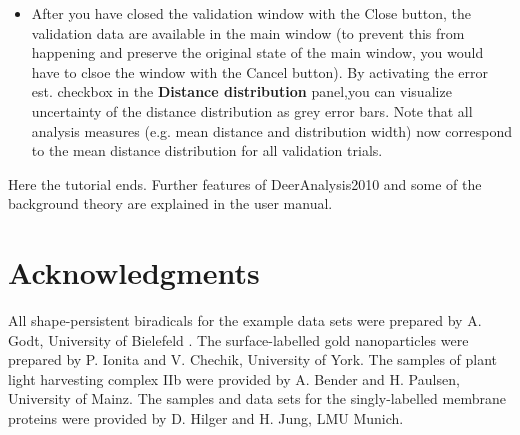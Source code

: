 \documentclass[11pt,a4paper]{article}
\begin{document}
\begin{itemize}
	\item After you have closed the validation window with the {\ttfamily Close} button, the validation data are available in the main window (to prevent this from happening and preserve the original state of the main window, you would have to clsoe the window with the {\ttfamily Cancel} button). By activating the {\ttfamily error est.} checkbox in the {\ttfamily \bf Distance distribution} panel,you can visualize uncertainty of the distance distribution as grey error bars. Note that all analysis measures (e.g. mean distance and distribution width) now correspond to the mean distance distribution for all validation trials.  	 
\end{itemize}

Here the tutorial ends. Further features of DeerAnalysis2010 and some of the background theory are explained in the user manual. 

\section*{Acknowledgments}
All shape-persistent biradicals for the example data sets were prepared by A. Godt, University of Bielefeld \cite{godt2000}. The surface-labelled gold nanoparticles were prepared by P. Ionita and V. Chechik, University of York. The samples of plant light harvesting complex IIb were provided by A. Bender and H. Paulsen, University of Mainz. The samples and data sets for the singly-labelled membrane proteins were provided by D. Hilger and H. Jung, LMU Munich.
\end{document}
